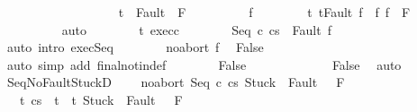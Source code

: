 \begin{isabellebody}
\isanewline
\ \ \ \ \isamarkupfalse%
\ \isanewline
\ \ \ \ \isacommand{{\isacharbraceleft}}\isamarkupfalse%
\isanewline
\ \ \ \ \ \ \isamarkupfalse%
\ {\isachardoublequoteopen}t\ {\isasymin}\ Fault\ {\isacharbackquote}\ F{\isachardoublequoteclose}\isanewline
\ \ \ \ \ \ \isamarkupfalse%
\ \isamarkupfalse%
\ f\ \ \isanewline
\ \ \ \ \ \ t{\isacharcolon}\ {\isachardoublequoteopen}t{\isacharequal}Fault\ f{\isachardoublequoteclose}\ \ f{\isacharcolon}\ {\isachardoublequoteopen}f\ {\isasymin}\ F{\isachardoublequoteclose}\isanewline
\ \ \ \ \ \ \ \ \isamarkupfalse%
\ auto\isanewline
\ \ \ \ \ \ \isamarkupfalse%
\ t\ exec{\isacharunderscore}c{}\isanewline
\ \ \ \ \ \ \isamarkupfalse%
\ {\isachardoublequoteopen}{\isasymGamma}{\isasymturnstile}{\isasymlangle}Seq\ c{}\ c{}{\isacharcomma}s{\isasymrangle}\ {\isasymRightarrow}\ Fault\ f{\isachardoublequoteclose}\isanewline
\ \ \ \ \ \ \ \ \isamarkupfalse%
\ {\isacharparenleft}auto\ intro{\isacharcolon}\ exec{\isacharunderscore}Seq{\isacharprime}{\isacharparenright}\isanewline
\ \ \ \ \ \ \isamarkupfalse%
\ noabort\ f\ \isamarkupfalse%
\ False\isanewline
\ \ \ \ \ \ \ \ \isamarkupfalse%
\ {\isacharparenleft}auto\ simp\ add{\isacharcolon}\ final{\isacharunderscore}notin{\isacharunderscore}def{\isacharparenright}\isanewline
\ \ \ \ \ \ \isamarkupfalse%
\ False\ \isacommand{{\isachardot}{\isachardot}}\isamarkupfalse%
\isanewline
\ \ \ \ \isacommand{{\isacharbraceright}}\isamarkupfalse%
\isanewline
\ \ \ \ \isamarkupfalse%
\ \isamarkupfalse%
\ False\ \isamarkupfalse%
\ auto\isanewline
\ \ \isamarkupfalse%
\isanewline
{}\isamarkupfalse%
%
\endisatagproof
{\isafoldproof}%
%
\isadelimproof
\isanewline
%
\endisadelimproof
\isanewline
{}\isamarkupfalse%
\ Seq{\isacharunderscore}NoFaultStuckD{}{\isacharprime}{\isacharcolon}\ \isanewline
\ \ \ noabort{\isacharcolon}\ {\isachardoublequoteopen}{\isasymGamma}{\isasymturnstile}{\isasymlangle}Seq\ c{}\ c{}{\isacharcomma}s{\isasymrangle}\ {\isasymRightarrow}{\isasymnotin}{\isacharparenleft}{\isacharbraceleft}Stuck{\isacharbraceright}\ {\isasymunion}\ Fault\ {\isacharbackquote}\ \ F{\isacharparenright}{\isachardoublequoteclose}\isanewline
\ \ \ {\isachardoublequoteopen}{\isasymforall}t{\isachardot}\ {\isasymGamma}{\isasymturnstile}{\isasymlangle}c{}{\isacharcomma}s{\isasymrangle}\ {\isasymRightarrow}\ t\ {\isasymlongrightarrow}\ t{\isasymnotin}\ {\isacharparenleft}{\isacharbraceleft}Stuck{\isacharbraceright}\ {\isasymunion}\ Fault\ {\isacharbackquote}\ \ F{\isacharparenright}\ {\isasymlongrightarrow}\ \isanewline

\end{isabellebody}

